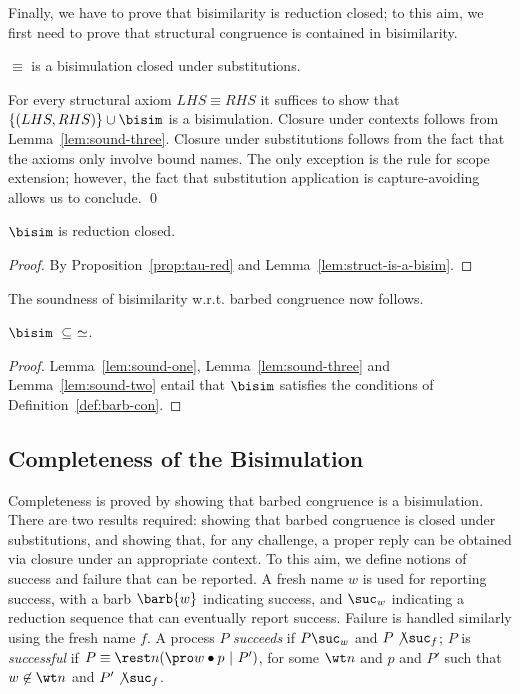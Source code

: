 \documentclass{LMCS}
\renewcommand{\beq}{\simeq}
\begin{document}
Finally, we have to prove that bisimilarity is reduction closed; to this aim, we first need
to prove that structural congruence is contained in bisimilarity.

\begin{lem}
\label{lem:struct-is-a-bisim}
$\equiv$ is a bisimulation closed under substitutions.
\end{lem}
\proof
For every structural axiom $LHS \equiv RHS$ it suffices to show that $\{(LHS,RHS)\} \cup \bisim$
is a bisimulation. Closure under contexts follows from Lemma~\ref{lem:sound-three}. Closure under
substitutions follows from the fact that the axioms only involve bound names. The only exception 
is the rule for scope extension; however, the fact that substitution application is capture-avoiding
allows us to conclude.
\qed

\begin{lem}
\label{lem:sound-two}
$\bisim$ is reduction closed.
\end{lem}
\begin{proof}
By Proposition~\ref{prop:tau-red} and Lemma~\ref{lem:struct-is-a-bisim}.
\end{proof}


The soundness of bisimilarity w.r.t. barbed congruence now follows.

\begin{thm}
\label{thm: sound}
$\bisim\ \subseteq\ \beq$.
\end{thm}
\begin{proof}
Lemma~\ref{lem:sound-one}, Lemma~\ref{lem:sound-three} and Lemma~\ref{lem:sound-two}
entail that $\bisim$ satisfies the conditions of Definition~\ref{def:barb-con}.
\end{proof}



\subsection{Completeness of the Bisimulation}

Completeness is proved by showing that barbed congruence is a bisimulation.
There are two results required:
showing that barbed congruence is closed under substitutions,
and showing that, for any challenge, a proper reply can be obtained via closure under an appropriate context.
To this aim, we define notions of success and failure that can be reported.
A fresh name $w$ is used for reporting success, with a barb $\barb{w}$ indicating success, and $\suc_w$ indicating a reduction sequence that can eventually report success. Failure is handled similarly using the fresh name $f$.
A process $P$ {\em succeeds} 
if $P\suc_w$ and $P\not\suc_f$;
$P$ is {\em successful} if $P \equiv \rest n(\pro w\bullet p\ |\ P')$, for some $\wt n$ and $p$ and $P'$ 
such that $w \not\in \wt n$ and $P'\not\suc_f$.
\end{document}
